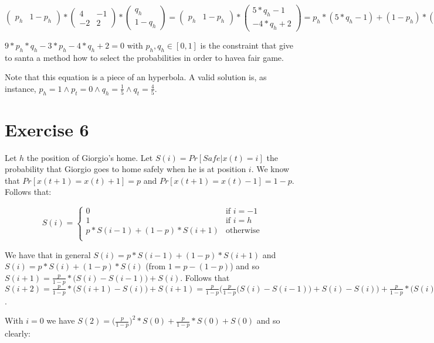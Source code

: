 \documentclass[paper=a4, fontsize=11pt]{scrartcl} %
\numberwithin{equation}{section} %
\numberwithin{figure}{section} %
\numberwithin{table}{section} %
\begin{document}
\bigskip
$\begin{pmatrix} p_h & 1 - p_h \end{pmatrix}*\begin{pmatrix} 4 & -1 \\ -2 & 2 \end{pmatrix}*\begin{pmatrix} q_h \\ 1 - q_h \end{pmatrix} = \begin{pmatrix} p_h & 1 - p_h \end{pmatrix}*\begin{pmatrix} 5*q_h -1 \\ -4*q_h +2 \end{pmatrix} = p_h*(5*q_h -1) + (1-p_h)*(-4*q_h +2) = 9*p_h*q_h -3*p_h -4*q_h +2$
\bigskip

$9*p_h*q_h -3*p_h -4*q_h +2 = 0$ with $p_h, q_h \in [0,1]$ is the constraint that give to santa a method how to select the probabilities in order to havea fair game.

Note that this equation is a piece of an hyperbola. A valid solution is, as instance, $p_h = 1 \land p_t = 0 \land q_h = \frac{1}{5} \land q_t = \frac{4}{5}$.

\section{Exercise 6}

Let $h$ the position of Giorgio's home.
Let $S(i) = Pr[Safe|x(t)=i]$ the probability that Giorgio goes to home safely when he is at position $i$. We know that $Pr[x(t+1) = x(t)+1] = p$ and $Pr[x(t+1) = x(t)-1] = 1-p$. Follows that:

\[
S(i) = \begin{cases}
0 & \text{if }i = -1 \\
1 & \text{if }i = h \\
p*S(i-1) + (1-p)*S(i+1) & \text{otherwise} \\
\end{cases}
\]

We have that in general $S(i) = p*S(i-1) + (1-p)*S(i+1)$ and $S(i) = p*S(i) + (1-p)*S(i)$ (from $1 = p - (1-p)$) and so $S(i+1) = \frac{p}{1-p}*\big(S(i) - S(i-1)\big) + S(i)$.
Follows that $S(i+2) = \frac{p}{1-p}*\big(S(i+1) - S(i)\big) + S(i+1) = \frac{p}{1-p}\Big(\frac{p}{1-p}\big(S(i) - S(i-1)\big) + S(i) - S(i)\Big) + \frac{p}{1-p}*\big(S(i) - S(i-1)\big) + S(i)$.

With $i = 0$ we have $S(2) = \big(\frac{p}{1-p})^2*S(0) + \frac{p}{1-p}*S(0) + S(0)$ and so clearly:
\end{document}
